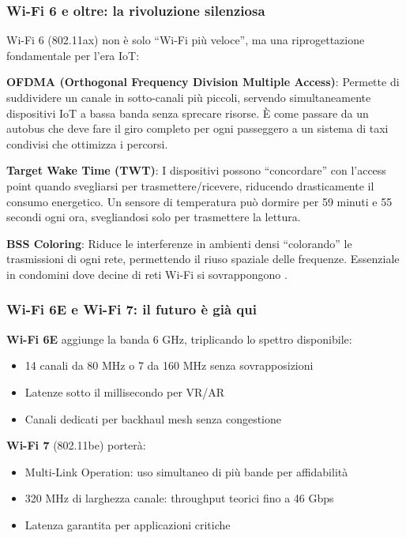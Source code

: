 \subsubsection{Wi-Fi 6 e oltre: la rivoluzione silenziosa}

Wi-Fi 6 (802.11ax) non è solo ``Wi-Fi più veloce'', ma una riprogettazione fondamentale per l'era IoT:

\textbf{OFDMA (Orthogonal Frequency Division Multiple Access)}:
Permette di suddividere un canale in sotto-canali più piccoli, servendo simultaneamente dispositivi IoT a bassa banda senza sprecare risorse. È come passare da un autobus che deve fare il giro completo per ogni passeggero a un sistema di taxi condivisi che ottimizza i percorsi.

\textbf{Target Wake Time (TWT)}:
I dispositivi possono ``concordare'' con l'access point quando svegliarsi per trasmettere/ricevere, riducendo drasticamente il consumo energetico. Un sensore di temperatura può dormire per 59 minuti e 55 secondi ogni ora, svegliandosi solo per trasmettere la lettura.

\textbf{BSS Coloring}:
Riduce le interferenze in ambienti densi ``colorando'' le trasmissioni di ogni rete, permettendo il riuso spaziale delle frequenze. Essenziale in condomini dove decine di reti Wi-Fi si sovrappongono \parencite{zhang2021wifi6}.

\subsubsection{Wi-Fi 6E e Wi-Fi 7: il futuro è già qui}

\textbf{Wi-Fi 6E} aggiunge la banda 6 GHz, triplicando lo spettro disponibile:
\begin{itemize}
    \item 14 canali da 80 MHz o 7 da 160 MHz senza sovrapposizioni
    \item Latenze sotto il millisecondo per VR/AR
    \item Canali dedicati per backhaul mesh senza congestione
\end{itemize}

\textbf{Wi-Fi 7} (802.11be) porterà:
\begin{itemize}
    \item Multi-Link Operation: uso simultaneo di più bande per affidabilità
    \item 320 MHz di larghezza canale: throughput teorici fino a 46 Gbps
    \item Latenza garantita per applicazioni critiche
\end{itemize}

